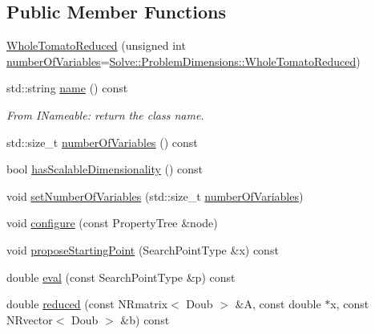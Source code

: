 \subsection*{\-Public \-Member \-Functions}
\begin{DoxyCompactItemize}
\item 
\hyperlink{struct_p_r_p_s_evolution_1_1_models_1_1_whole_tomato_reduced_a7a79f5f704e7e80dce3437a56516520b}{\-Whole\-Tomato\-Reduced} (unsigned int \hyperlink{struct_p_r_p_s_evolution_1_1_models_1_1_whole_tomato_reduced_ae0d163644062d0cfa3de6a438a6af096}{number\-Of\-Variables}=\hyperlink{struct_p_r_p_s_evolution_1_1_solve_1_1_problem_dimensions_a91e0eedbd88fa3c084e5d18ed8155579}{\-Solve\-::\-Problem\-Dimensions\-::\-Whole\-Tomato\-Reduced})
\item 
std\-::string \hyperlink{struct_p_r_p_s_evolution_1_1_models_1_1_whole_tomato_reduced_a50a2b1bf061ac7643b4978516b1e85ce}{name} () const 
\begin{DoxyCompactList}\small\item\em \-From \-I\-Nameable\-: return the class name. \end{DoxyCompactList}\item 
std\-::size\-\_\-t \hyperlink{struct_p_r_p_s_evolution_1_1_models_1_1_whole_tomato_reduced_ae0d163644062d0cfa3de6a438a6af096}{number\-Of\-Variables} () const 
\item 
bool \hyperlink{struct_p_r_p_s_evolution_1_1_models_1_1_whole_tomato_reduced_ac6266a86c57fb3b179333725a3020a7d}{has\-Scalable\-Dimensionality} () const 
\item 
void \hyperlink{struct_p_r_p_s_evolution_1_1_models_1_1_whole_tomato_reduced_a0b96dde6c26043f61f1ac2f1b8847987}{set\-Number\-Of\-Variables} (std\-::size\-\_\-t \hyperlink{struct_p_r_p_s_evolution_1_1_models_1_1_whole_tomato_reduced_ae0d163644062d0cfa3de6a438a6af096}{number\-Of\-Variables})
\item 
void \hyperlink{struct_p_r_p_s_evolution_1_1_models_1_1_whole_tomato_reduced_a577db05d9e7c3c3712d254e0d08dbf97}{configure} (const \-Property\-Tree \&node)
\item 
void \hyperlink{struct_p_r_p_s_evolution_1_1_models_1_1_whole_tomato_reduced_af15e5d41a83ec7394d9a9a13f35d36d7}{propose\-Starting\-Point} (\-Search\-Point\-Type \&x) const 
\item 
double \hyperlink{struct_p_r_p_s_evolution_1_1_models_1_1_whole_tomato_reduced_a22ff8e847a09a36a373259e693b1675b}{eval} (const \-Search\-Point\-Type \&p) const 
\item 
double \hyperlink{struct_p_r_p_s_evolution_1_1_models_1_1_whole_tomato_reduced_a783c59b2156b7fe7b274fee47ccc0162}{reduced} (const \-N\-Rmatrix$<$ \-Doub $>$ \&\-A, const double $\ast$x, const \-N\-Rvector$<$ \-Doub $>$ \&b) const 

\end{DoxyCompactItemize}
